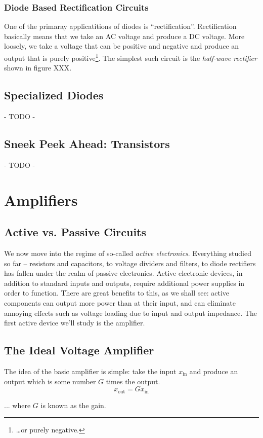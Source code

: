 \documentclass{tufte-book}
\begin{document}
\subsection{Diode Based Rectification Circuits}
One of the primaray applicatitions of diodes is ``rectification''. Rectification basically means that we take an AC voltage and produce a DC voltage. More loosely, we take a voltage that can be positive and negative and produce an output that is purely positive\footnote{\ldots or purely negative.}. The simplest such circuit is the \textit{half-wave rectifier} shown in figure  XXX.
\section{Specialized Diodes}
- TODO -
\section{Sneek Peek Ahead: Transistors}
- TODO -
\chapter{Amplifiers}
\section{Active vs. Passive Circuits}
We now move into the regime of so-called \textit{active electronics}. Everything studied so far -- resistors and capacitors, to voltage dividers and filters, to diode rectifiers has fallen under the realm of passive electronics. Active electronic devices, in addition to standard inputs and outputs, require additional power supplies in order to function. There are great benefits to this, as we shall see: active components can output more power than at their input, and can eliminate annoying effects such as voltage loading due to input and output impedance. The first active device we'll study is the amplifier.
\section{The Ideal Voltage Amplifier}
The idea of the basic amplifier is simple: take the input $x_\text{in}$ and produce an output which is some number $G$ times the output.
\begin{equation}
\label{eq:simple_amp}
x_\text{out} = Gx_\text{in}
\end{equation}

\noindent ... where $G$ is known as the gain.
\end{document}
